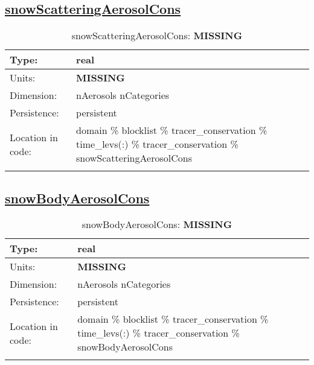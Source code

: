 \subsection[snowScatteringAerosolCons]{\hyperref[sec:var_tab_tracer_conservation]{snowScatteringAerosolCons}}
\label{subsec:var_sec_tracer_conservation_snowScatteringAerosolCons}
\begin{center}
\begin{longtable}{| p{2.0in} | p{4.0in} |}
        \hline 
        Type: & real \\
        \hline 
        Units: & {\bf \color{red} MISSING} \\
        \hline 
        Dimension: & nAerosols nCategories \\
        \hline 
        Persistence: & persistent \\
        \hline 
         Location in code: & domain \% blocklist \% tracer\_conservation \% time\_levs(:) \% tracer\_conservation \% snowScatteringAerosolCons \\
         \hline 
    \caption{snowScatteringAerosolCons: {\bf \color{red} MISSING}}
\end{longtable}
\end{center}
\subsection[snowBodyAerosolCons]{\hyperref[sec:var_tab_tracer_conservation]{snowBodyAerosolCons}}
\label{subsec:var_sec_tracer_conservation_snowBodyAerosolCons}
\begin{center}
\begin{longtable}{| p{2.0in} | p{4.0in} |}
        \hline 
        Type: & real \\
        \hline 
        Units: & {\bf \color{red} MISSING} \\
        \hline 
        Dimension: & nAerosols nCategories \\
        \hline 
        Persistence: & persistent \\
        \hline 
         Location in code: & domain \% blocklist \% tracer\_conservation \% time\_levs(:) \% tracer\_conservation \% snowBodyAerosolCons \\
         \hline 
    \caption{snowBodyAerosolCons: {\bf \color{red} MISSING}}
\end{longtable}
\end{center}

